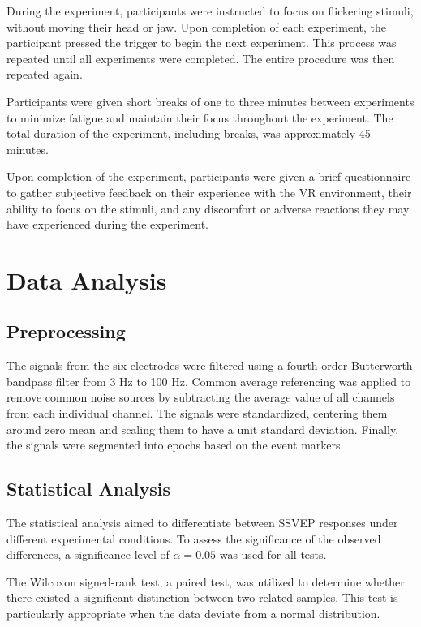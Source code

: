 During the experiment, participants were instructed to focus on flickering stimuli, without moving their head or jaw. Upon completion of each experiment, the participant pressed the trigger to begin the next experiment. This process was repeated until all experiments were completed. The entire procedure was then repeated again. 

Participants were given short breaks of one to three minutes between experiments to minimize fatigue and maintain their focus throughout the experiment. The total duration of the experiment, including breaks, was approximately 45 minutes.

Upon completion of the experiment, participants were given a brief questionnaire to gather subjective feedback on their experience with the VR environment, their ability to focus on the stimuli, and any discomfort or adverse reactions they may have experienced during the experiment.

\section{Data Analysis}

\subsection{Preprocessing}

The signals from the six electrodes were filtered using a fourth-order Butterworth bandpass filter from 3 Hz to 100 Hz. Common average referencing was applied to remove common noise sources by subtracting the average value of all channels from each individual channel. The signals were standardized, centering them around zero mean and scaling them to have a unit standard deviation. Finally, the signals were segmented into epochs based on the event markers.

\subsection{Statistical Analysis}

The statistical analysis aimed to differentiate between SSVEP responses under different experimental conditions. To assess the significance of the observed differences, a significance level of $\alpha=0.05$ was used for all tests. 

The Wilcoxon signed-rank test, a paired test, was utilized to determine whether there existed a significant distinction between two related samples. This test is particularly appropriate when the data deviate from a normal distribution. 

